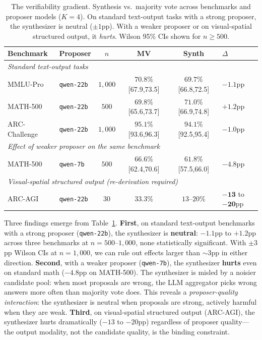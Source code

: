 \documentclass[11pt]{amsart}
\newcommand\1{{\mathds{1}}}
\theoremstyle{definition}
\theoremstyle{remark}
\numberwithin{equation}{section}
\begin{document}
\begin{table}[h]
\centering\small
\caption{The verifiability gradient. Synthesis vs.\ majority vote across benchmarks and proposer models ($K\!=\!4$). On standard text-output tasks with a strong proposer, the synthesizer is neutral ($\pm 1$pp). With a weaker proposer or on visual-spatial structured output, it \emph{hurts}. Wilson 95\% CIs shown for $n\!\geq\!500$.}
\label{tab:gradient}
\begin{tabular}{@{}llcccl@{}}
\toprule
Benchmark & Proposer & $n$ & MV & Synth & $\Delta$ \\
\midrule
\multicolumn{6}{l}{\emph{Standard text-output tasks}} \\
MMLU-Pro & \texttt{qwen-22b} & $1{,}000$ & $70.8\%$ {\scriptsize[67.9,73.5]} & $69.7\%$ {\scriptsize[66.8,72.5]} & $-1.1$pp \\
MATH-500 & \texttt{qwen-22b} & $500$ & $69.8\%$ {\scriptsize[65.6,73.7]} & $71.0\%$ {\scriptsize[66.9,74.8]} & $+1.2$pp \\
ARC-Challenge & \texttt{qwen-22b} & $1{,}000$ & $95.1\%$ {\scriptsize[93.6,96.3]} & $94.1\%$ {\scriptsize[92.5,95.4]} & $-1.0$pp \\
\midrule
\multicolumn{6}{l}{\emph{Effect of weaker proposer on the same benchmark}} \\
MATH-500 & \texttt{qwen-7b} & $500$ & $66.6\%$ {\scriptsize[62.4,70.6]} & $61.8\%$ {\scriptsize[57.5,66.0]} & $\mathbf{-4.8}$pp \\
\midrule
\multicolumn{6}{l}{\emph{Visual-spatial structured output (re-derivation required)}} \\
ARC-AGI & \texttt{qwen-22b} & $30$ & $33.3\%$ & $13$--$20\%$ & $\mathbf{-13}$ to $\mathbf{-20}$pp \\
\bottomrule
\end{tabular}
\end{table}

Three findings emerge from Table~\ref{tab:gradient}.
\textbf{First}, on standard text-output benchmarks with a strong proposer (\texttt{qwen-22b}), the synthesizer is \textbf{neutral}: $-1.1$pp to $+1.2$pp across three benchmarks at $n\!=\!500$--$1{,}000$, none statistically significant.
With $\pm 3$pp Wilson CIs at $n\!=\!1{,}000$, we can rule out effects larger than $\sim\!3$pp in either direction.
\textbf{Second}, with a weaker proposer (\texttt{qwen-7b}), the synthesizer \textbf{hurts} even on standard math ($-4.8$pp on MATH-500).
The synthesizer is misled by a noisier candidate pool: when most proposals are wrong, the LLM aggregator picks wrong answers more often than majority vote does.
This reveals a \emph{proposer-quality interaction}: the synthesizer is neutral when proposals are strong, actively harmful when they are weak.
\textbf{Third}, on visual-spatial structured output (ARC-AGI), the synthesizer hurts dramatically ($-13$ to $-20$pp) regardless of proposer quality---the output modality, not the candidate quality, is the binding constraint.
\end{document}
